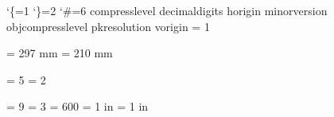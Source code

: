 

\begingroup
  \catcode`\{=1 %
  \catcode`\}=2 %
  \catcode`\#=6 %
  \def\list{%
      {compresslevel}%
      {decimaldigits}%
      {horigin}%
      {minorversion}%
      {objcompresslevel}%
      {pkresolution}%
      {vorigin}%
  }%
  \let\pdfoutput\outputmode
  \let\pdfpageheight\pageheight
  \let\pdfpagewidth\pagewidth
  \def\do#1{%
    \ifx\relax#1\else
      \expandafter\edef\csname pdf#1\endcsname{\pdfvariable #1}%
      \expandafter\do
    \fi
  }%
  \expandafter\do\list\relax
  \pdfoutput           = 1

  \pdfpageheight       = 297 mm
  \pdfpagewidth        = 210 mm

  \pdfminorversion     = 5
  \pdfobjcompresslevel = 2

  \pdfcompresslevel    = 9
  \pdfdecimaldigits    = 3
  \pdfpkresolution     = 600
  \pdfhorigin          = 1 in
  \pdfvorigin          = 1 in
  \ifx\dvimode\relax
    \pdfoutput=0 %
  \fi
  \let\dvimode\undefined
\endgroup
